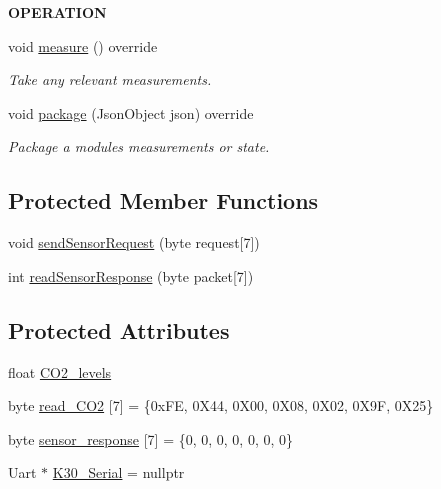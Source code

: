 \begin{Indent}{\bf O\+P\+E\+R\+A\+T\+I\+ON}\par
\begin{DoxyCompactItemize}
\item 
void \hyperlink{class_loom___k30_ad13974aee5a993538a0ba43b1e68beac}{measure} () override
\begin{DoxyCompactList}\small\item\em Take any relevant measurements. \end{DoxyCompactList}\item 
void \hyperlink{class_loom___k30_a20b989aee8822e204e951edbc6a5969a}{package} (Json\+Object json) override
\begin{DoxyCompactList}\small\item\em Package a modules measurements or state. \end{DoxyCompactList}\end{DoxyCompactItemize}
\end{Indent}
\subsection*{Protected Member Functions}
\begin{DoxyCompactItemize}
\item 
void \hyperlink{class_loom___k30_a0b67390fda29e2e5761d479ef03914a8}{send\+Sensor\+Request} (byte request\mbox{[}7\mbox{]})
\item 
int \hyperlink{class_loom___k30_a73652d3a27632e202f65eb442f3a6a99}{read\+Sensor\+Response} (byte packet\mbox{[}7\mbox{]})
\end{DoxyCompactItemize}
\subsection*{Protected Attributes}
\begin{DoxyCompactItemize}
\item 
float \hyperlink{class_loom___k30_a99216bf4efea0cea4033abbd4f8c4cf8}{C\+O2\+\_\+levels}
\item 
byte \hyperlink{class_loom___k30_a0b8f6461001363a009dc206347084264}{read\+\_\+\+C\+O2} \mbox{[}7\mbox{]} = \{0x\+F\+E, 0\+X44, 0\+X00, 0\+X08, 0\+X02, 0\+X9\+F, 0\+X25\}
\item 
byte \hyperlink{class_loom___k30_a82e7ef99aa9ee1709271bfe491e35632}{sensor\+\_\+response} \mbox{[}7\mbox{]} = \{0, 0, 0, 0, 0, 0, 0\}
\item 
Uart $\ast$ \hyperlink{class_loom___k30_a6066aba52897fee08390c9e6a5baf688}{K30\+\_\+\+Serial} = nullptr
\end{DoxyCompactItemize}
